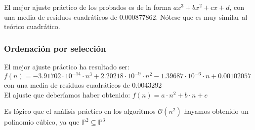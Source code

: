 \documentclass[a4paper, 11pt]{article} %
\begin{document}
  El mejor ajuste práctico de los probados es de la forma $ax^3+bx^2+cx+d$,
  con una media de residuos cuadráticos de $0.000877862$. Nótese que es muy similar
  al teórico cuadrático.
  
    \noindent{}
    
  \subsubsection{Ordenación por selección}
  El mejor ajuste práctico ha resultado ser: $f(n)=-3.91702\cdot 10^{-14} \cdot n^3+2.20218\cdot 10^{-9}\cdot n^2-1.39687 \cdot 10^{-6}\cdot n+0.00102057$
  con una media de residuos cuadráticos de $0.0043292$\\
  El ajuste que deberíamos haber obtenido: $f(n)=a \cdot n^2+b \cdot n+c$\\
    
    \noindent{}
    
Es lógico que el análisis práctico en los algoritmos $\mathcal{O}(n^2)$
hayamos obtenido un polinomio cúbico, ya que $\mathbb{P}^2 \subseteq \mathbb{P}^3$
\end{document}
